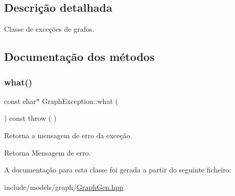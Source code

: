 \subsection{Descrição detalhada}
Classe de exceções de grafos. 

\subsection{Documentação dos métodos}
\mbox{\label{classGraphException_ad4368b8af89252086b225cedcfc38639}} 
\subsubsection{\texorpdfstring{what()}{what()}}
{\footnotesize\ttfamily const char$\ast$ Graph\+Exception\+::what (\begin{DoxyParamCaption}{ }\end{DoxyParamCaption}) const throw ( ) \hspace{0.3cm}{\ttfamily [inline]}}

Retorna a mensagem de erro da exceção. \begin{DoxyReturn}{Retorna}
Mensagem de erro. 
\end{DoxyReturn}


A documentação para esta classe foi gerada a partir do seguinte ficheiro\+:\begin{DoxyCompactItemize}
\item 
include/models/graph/\mbox{\hyperlink{GraphGen_8hpp}{Graph\+Gen.\+hpp}}\end{DoxyCompactItemize}
